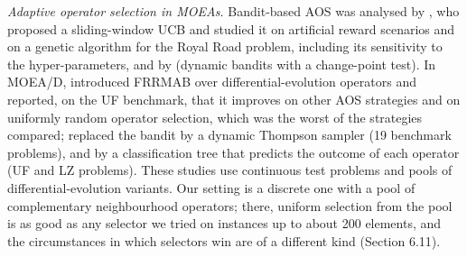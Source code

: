 \emph{Adaptive operator selection in MOEAs.} Bandit-based AOS was analysed by \citet{fialho2010}, who proposed a sliding-window UCB and studied it on artificial reward scenarios and on a genetic algorithm for the Royal Road problem, including its sensitivity to the hyper-parameters, and by \citet{dacosta2008} (dynamic bandits with a change-point test). In MOEA/D, \citet{li2014} introduced FRRMAB over differential-evolution operators and reported, on the UF benchmark, that it improves on other AOS strategies and on uniformly random operator selection, which was the worst of the strategies compared; \citet{sun2020} replaced the bandit by a dynamic Thompson sampler (19 benchmark problems), and \citet{geng2023} by a classification tree that predicts the outcome of each operator (UF and LZ problems). These studies use continuous test problems and pools of differential-evolution variants. Our setting is a discrete one with a pool of complementary neighbourhood operators; there, uniform selection from the pool is as good as any selector we tried on instances up to about 200 elements, and the circumstances in which selectors win are of a different kind (Section 6.11).
